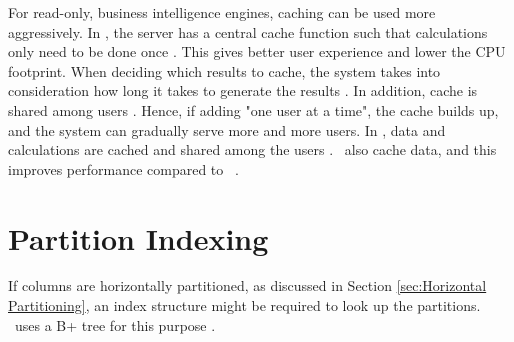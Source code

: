 For read-only, business intelligence engines, caching can be used more aggressively. In \qlikview, the server has a central cache function such that calculations only need to be done once \cite{Qlik2011-ef}. This gives better user experience and lower the CPU footprint. When deciding which results to cache, the system takes into consideration how long it takes to generate the results \cite{noauthor_undateds-js}. In addition, cache is shared among users \cite{Qlik2011-yc}. Hence, if adding "one user at a time", the cache builds up, and the system can gradually serve more and more users. In \tableau, data and calculations are cached and shared among the users \cite{Kamkolkar2015-iq}. \vertipaq~also cache data, and this improves performance compared to \mssql~\cite{Ferrari2012-hm}.

\section{Partition Indexing}
\label{sec:Partition Indexing}
If columns are horizontally partitioned, as discussed in Section \ref{sec:Horizontal Partitioning}, an index structure might be required to look up the partitions. \ibm~uses a B+ tree for this purpose \cite{Raman2013-em}.

